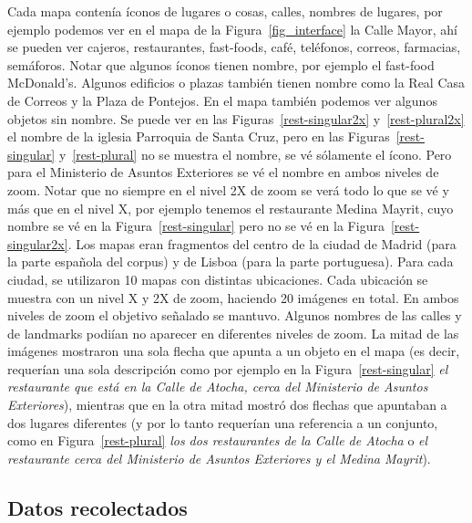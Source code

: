 Cada mapa conten\'ia \'iconos de lugares o cosas, calles, nombres de lugares, por ejemplo podemos ver en el mapa de la Figura~\ref{fig_interface} la Calle Mayor, ah\'i se pueden ver cajeros, restaurantes, fast-foods, caf\'e, tel\'efonos, correos, farmacias, sem\'aforos. Notar que algunos \'iconos tienen nombre, por ejemplo el fast-food McDonald's. Algunos edificios o plazas tambi\'en tienen nombre como la Real Casa de Correos y la Plaza de Pontejos. En el mapa tambi\'en podemos ver algunos objetos sin nombre.
Se puede ver en las Figuras~\ref{rest-singular2x} y~\ref{rest-plural2x}  el nombre de la iglesia Parroquia de Santa Cruz, pero en las Figuras~\ref{rest-singular} y~\ref{rest-plural} no se muestra el nombre, se v\'e s\'olamente el \'icono. Pero para el Ministerio de Asuntos Exteriores se v\'e el nombre en ambos niveles de zoom. Notar que no siempre en el nivel 2X de zoom se ver\'a todo lo que se v\'e y m\'as que en el nivel X, por ejemplo tenemos el restaurante Medina Mayrit, cuyo nombre se v\'e en la Figura~\ref{rest-singular} pero no se v\'e en la Figura~\ref{rest-singular2x}. 
Los mapas eran fragmentos del centro de la ciudad de Madrid (para la parte espa\~nola del corpus) y de Lisboa (para la parte portuguesa).
Para cada ciudad, se utilizaron 10 mapas con distintas ubicaciones. Cada ubicaci\'on se muestra con un nivel X y 2X de zoom, haciendo 20 im\'agenes en total. En ambos niveles de zoom el objetivo se\~{n}alado se mantuvo. Algunos nombres de las calles y de landmarks podi\'{i}an no aparecer en diferentes niveles de zoom.
La mitad de las im\'agenes mostraron una sola flecha que apunta a un objeto en el mapa (es decir, requer\'{i}an una sola descripci\'on como por ejemplo en la Figura~\ref{rest-singular} {\it el restaurante que est\'a en la Calle de Atocha, cerca del Ministerio de Asuntos Exteriores}), mientras que en la otra mitad mostr\'o dos flechas que apuntaban a dos lugares diferentes (y por lo tanto requer\'ian una referencia a un conjunto, como en Figura~\ref{rest-plural} {\it los dos restaurantes de la Calle de Atocha} o {\it el restaurante cerca del Ministerio de Asuntos Exteriores y el Medina Mayrit}).


\subsection{Datos recolectados}
\label{sec:datos_recolectados}


